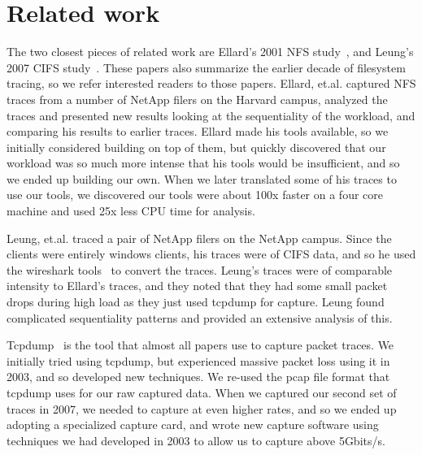 \section{Related work}
\label{sec:related}

The two closest pieces of related work are Ellard's 2001 NFS
study~\cite{EllardFast03}, and Leung's 2007 CIFS
study~\cite{LeungUsenix08}.  These papers also summarize the earlier
decade of filesystem tracing, so we refer interested readers to those
papers.  Ellard, et.al. captured NFS traces from a number of NetApp
filers on the Harvard campus, analyzed the traces and presented new
results looking at the sequentiality of the workload, and comparing
his results to earlier traces.  Ellard made his tools available, so we
initially considered building on top of them, but quickly discovered
that our workload was so much more intense that his tools would be
insufficient, and so we ended up building our own.  When we later
translated some of his traces to use our tools, we discovered our
tools were about 100x faster on a four core machine and used 25x less
CPU time for analysis.

Leung, et.al. traced a pair of NetApp filers on the NetApp campus.
Since the clients were entirely windows clients, his traces were of
CIFS data, and so he used the wireshark tools~\cite{wireshark} to
convert the traces.  Leung's traces were of comparable intensity to
Ellard's traces, and they noted that they had some small packet drops
during high load as they just used tcpdump for capture.  Leung found
complicated sequentiality patterns and provided an extensive analysis
of this.

Tcpdump~\cite{tcpdump} is the tool that almost all papers use to capture packet
traces.  We initially tried using tcpdump, but experienced massive
packet loss using it in 2003, and so developed new techniques.  We
re-used the pcap file format that tcpdump uses for our raw captured
data.  When we captured our second set of traces in 2007, we needed to
capture at even higher rates, and so we ended up adopting a
specialized capture card, and wrote new capture software using
techniques we had developed in 2003 to allow us to capture above
5Gbits/s.


